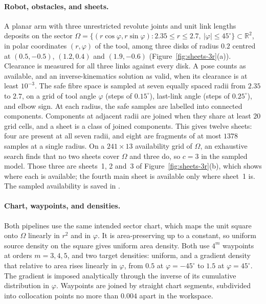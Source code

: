 \paragraph{Robot, obstacles, and sheets.}
A planar arm with three unrestricted revolute joints and unit link lengths deposits on the sector $\Omega=\{(r\cos\varphi,r\sin\varphi):2.35\le r\le2.7,\ |\varphi|\le45^\circ\}\subset\mathbb R^2$, in polar coordinates $(r,\varphi)$ of the tool, among three disks of radius $0.2$ centred at $(0.5,-0.5)$, $(1.2,0.4)$ and $(1.9,-0.6)$ (Figure~\ref{fig:sheets-3r}(a)). Clearance is measured for all three links against every disk. A pose counts as available, and an inverse-kinematics solution as valid, when its clearance is at least $10^{-3}$. The safe fibre space is sampled at seven equally spaced radii from $2.35$ to $2.7$, on a grid of tool angle $\varphi$ (steps of $0.15^\circ$), last-link angle (steps of $0.25^\circ$), and elbow sign. At each radius, the safe samples are labelled into connected components. Components at adjacent radii are joined when they share at least $20$ grid cells, and a sheet is a class of joined components. This gives twelve sheets: four are present at all seven radii, and eight are fragments of at most $1378$ samples at a single radius. On a $241\times13$ availability grid of $\Omega$, an exhaustive search finds that no two sheets cover $\Omega$ and three do, so $c=3$ in the sampled model. Those three are sheets~1, 2 and~3 of Figure~\ref{fig:sheets-3r}(b), which shows where each is available; the fourth main sheet is available only where sheet~1 is. The sampled availability is saved in .

\paragraph{Chart, waypoints, and densities.}
Both pipelines use the same intended sector chart, which maps the unit square onto $\Omega$ linearly in $r^2$ and in $\varphi$. It is area-preserving up to a constant, so uniform source density on the square gives uniform area density. Both use $4^m$ waypoints at orders $m=3,4,5$, and two target densities: uniform, and a gradient density that relative to area rises linearly in $\varphi$, from $0.5$ at $\varphi=-45^\circ$ to $1.5$ at $\varphi=45^\circ$. The gradient is imposed analytically through the inverse of its cumulative distribution in $\varphi$. Waypoints are joined by straight chart segments, subdivided into collocation points no more than $0.004$ apart in the workspace.

